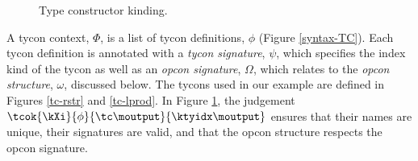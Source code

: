 \begin{figure}[t]
\begin{mathpar}

\end{mathpar}
\caption{Type constructor kinding.}
\label{statics-TC}
\end{figure} A tycon context, $\Phi$, is a list of tycon definitions, $\phi$ (Figure \ref{syntax-TC}). Each tycon definition is annotated with a \emph{tycon signature}, $\psi$, which specifies the index kind of the tycon as well as an \emph{opcon signature}, $\Omega$, which relates to the \emph{opcon structure}, $\omega$, discussed below.  The tycons used in our example are defined in Figures \ref{tc-rstr} and \ref{tc-lprod}.  In Figure \ref{statics-TC}, the judgement $\tcok{\kXi}{\phi}{\tc\moutput}{\ktyidx\moutput}$ ensures that their names are unique, their signatures are valid, and that the opcon structure respects the opcon signature.%





